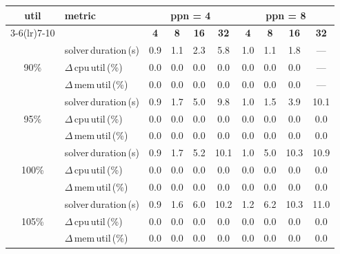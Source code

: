 \begin{tabular}{@{}c l *{8}{c}@{}}
\toprule
\multirow{2}{*}{\textbf{util}} & \multirow{2}{*}{\textbf{metric}} &\multicolumn{4}{c}{\textbf{ppn = 4}} & \multicolumn{4}{c}{\textbf{ppn = 8}}\\
\cmidrule(lr){3-6}\cmidrule(lr){7-10}
 &  & \textbf{4} & \textbf{8} & \textbf{16} & \textbf{32} & \textbf{4} & \textbf{8} & \textbf{16} & \textbf{32}\\
\midrule
\multirow{3}{*}{90\%}
& solver\,duration\,(s) & 0.9 & 1.1 & 2.3 & 5.8 & 1.0 & 1.1 & 1.8 & \multicolumn{1}{c}{—} \\
& $\Delta$\,cpu\,util\,(\%) & 0.0 & 0.0 & 0.0 & 0.0 & 0.0 & 0.0 & 0.0 & \multicolumn{1}{c}{—} \\
& $\Delta$\,mem\,util\,(\%) & 0.0 & 0.0 & 0.0 & 0.0 & 0.0 & 0.0 & 0.0 & \multicolumn{1}{c}{—} \\
\midrule
\multirow{3}{*}{95\%}
& solver\,duration\,(s) & 0.9 & 1.7 & 5.0 & 9.8 & 1.0 & 1.5 & 3.9 & 10.1 \\
& $\Delta$\,cpu\,util\,(\%) & 0.0 & 0.0 & 0.0 & 0.0 & 0.0 & 0.0 & 0.0 & 0.0 \\
& $\Delta$\,mem\,util\,(\%) & 0.0 & 0.0 & 0.0 & 0.0 & 0.0 & 0.0 & 0.0 & 0.0 \\
\midrule
\multirow{3}{*}{100\%}
& solver\,duration\,(s) & 0.9 & 1.7 & 5.2 & 10.1 & 1.0 & 5.0 & 10.3 & 10.9 \\
& $\Delta$\,cpu\,util\,(\%) & 0.0 & 0.0 & 0.0 & 0.0 & 0.0 & 0.0 & 0.0 & 0.0 \\
& $\Delta$\,mem\,util\,(\%) & 0.0 & 0.0 & 0.0 & 0.0 & 0.0 & 0.0 & 0.0 & 0.0 \\
\midrule
\multirow{3}{*}{105\%}
& solver\,duration\,(s) & 0.9 & 1.6 & 6.0 & 10.2 & 1.2 & 6.2 & 10.3 & 11.0 \\
& $\Delta$\,cpu\,util\,(\%) & 0.0 & 0.0 & 0.0 & 0.0 & 0.0 & 0.0 & 0.0 & 0.0 \\
& $\Delta$\,mem\,util\,(\%) & 0.0 & 0.0 & 0.0 & 0.0 & 0.0 & 0.0 & 0.0 & 0.0 \\
\bottomrule
\end{tabular}

